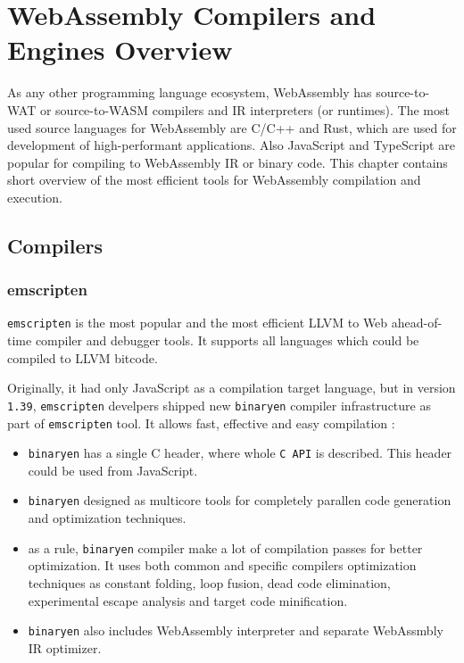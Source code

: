 \chapter{WebAssembly Compilers and Engines Overview}

As any other programming language ecosystem, WebAssembly has source-to-WAT or source-to-WASM compilers and IR interpreters (or runtimes).
The most used source languages for WebAssembly are C/C++ and Rust, which are used for development of high-performant applications.
Also JavaScript and TypeScript are popular for compiling to WebAssembly IR or binary code.
This chapter contains short overview of the most efficient tools for WebAssembly compilation and execution.

\section{Compilers}

\subsection{emscripten}

\texttt{emscripten} is the most popular and the most efficient LLVM to Web ahead-of-time compiler and debugger tools.
It supports all languages which could be compiled to LLVM bitcode.

Originally, it had only JavaScript as a compilation target language, but in version \texttt{1.39},
\texttt{emscripten} develpers shipped new \texttt{binaryen} compiler infrastructure as part of \texttt{emscripten} tool.
It allows fast, effective and easy compilation :
\begin{itemize}
 \item \texttt{binaryen} has a single C header, where whole \texttt{C API} is described. This header could be used from JavaScript.
 \item \texttt{binaryen} designed as multicore tools for completely parallen code generation and optimization techniques.
 \item as a rule, \texttt{binaryen} compiler make a lot of compilation passes for better optimization.
   It uses both common and specific compilers optimization techniques as constant folding, loop fusion,
   dead code elimination, experimental escape analysis and target code minification.
 \item \texttt{binaryen} also includes WebAssembly interpreter and separate WebAssmbly IR optimizer. 
\end{itemize}

